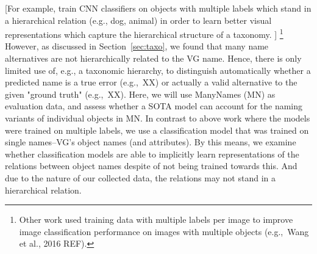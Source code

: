 [For example,  train CNN classifiers on objects with multiple labels which stand in a hierarchical relation (e.g., dog, animal) in order to learn better visual representations which capture the hierarchical structure of a taxonomy. ]
\footnote{Other work used training data with multiple labels per image to improve image classification performance on images with multiple objects (e.g.,~Wang et al., 2016 REF). }
%
%
However, as discussed in Section~\ref{sec:taxo}, we found that many name alternatives are not hierarchically related to the VG name. 
Hence, there is only limited use of, e.g., a taxonomic hierarchy, to distinguish automatically whether a predicted name is a true error (e.g.,\ XX) or actually a valid alternative to the given "ground truth" (e.g.,\ XX). 
%
%
%
Here, we will use ManyNames (MN) as evaluation data, and assess whether a SOTA model can account for the naming variants of individual objects in MN. 
In contrast to above work where the models were trained on multiple labels, we use a classification model that was trained on single names--VG's object names (and attributes). %
By this means, we examine whether classification models are able to implicitly learn representations of the relations between object names despite of not being trained towards this. 
And due to the nature of our collected data, the relations may not stand in a hierarchical relation. 

